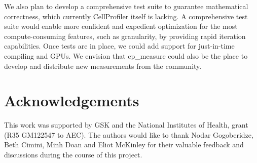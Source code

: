\documentclass{article}
\begin{document}
We also plan to develop a comprehensive test suite to guarantee mathematical correctness, which currently CellProfiler itself is lacking. A comprehensive test suite would enable more confident and expedient optimization for the most compute-consuming features, such as granularity, by providing rapid iteration capabilities. Once tests are in place, we could add support for just-in-time compiling and GPUs. We envision that cp\_measure could also be the place to develop and distribute new measurements from the community. 




\onecolumn
\section{Acknowledgements}
\label{sec:acknowledgements}

This work was supported by GSK and the National Institutes of Health, grant (R35 GM122547 to AEC). The authors would like to thank Nodar Gogoberidze, Beth Cimini, Minh Doan and Eliot McKinley for their valuable feedback and discussions during the course of this project.




\end{document}
